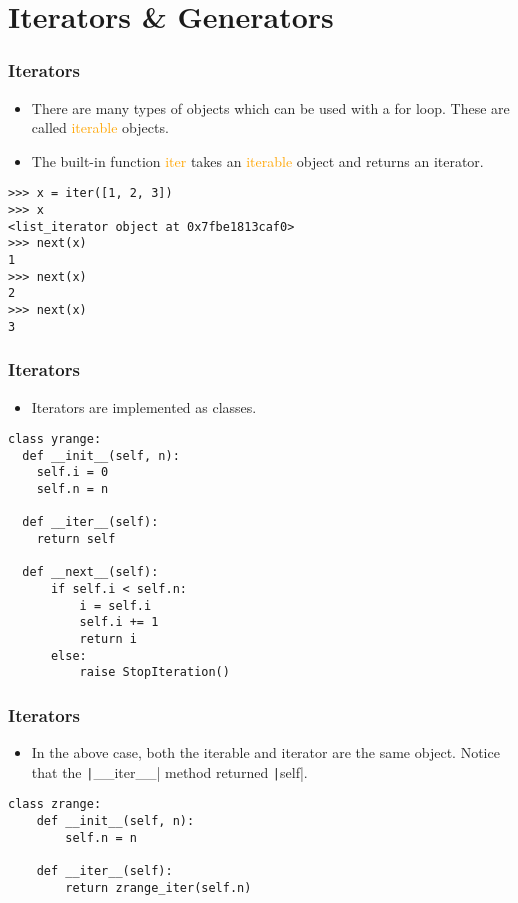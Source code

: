 \documentclass{../py-lecture}
\begin{document}
\section{Iterators \& Generators}

\begin{frame}[fragile]
	\frametitle{Iterators}
  \begin{itemize}
    \item There are many types of objects which can be used with a for loop.
    These are called \textcolor{Orange}{iterable} objects.
    \item The built-in function \textcolor{Orange}{iter} takes an \textcolor{Orange}{iterable}
    object and returns an iterator.
  \end{itemize}
  \begin{verbatim}
>>> x = iter([1, 2, 3])
>>> x
<list_iterator object at 0x7fbe1813caf0>
>>> next(x)
1
>>> next(x)
2
>>> next(x)
3
  \end{verbatim}
\end{frame}

\begin{frame}[fragile]
	\frametitle{Iterators}
  \begin{itemize}
    \item Iterators are implemented as classes.
  \end{itemize}
  \begin{verbatim}
class yrange:
  def __init__(self, n):
    self.i = 0
    self.n = n

  def __iter__(self):
    return self

  def __next__(self):
      if self.i < self.n:
          i = self.i
          self.i += 1
          return i
      else:
          raise StopIteration()
    \end{verbatim}
\end{frame}

\begin{frame}[fragile]
	\frametitle{Iterators}
  \begin{itemize}
    \item In the above case, both the iterable and iterator are the same object. Notice that the \texttt|__iter__| method returned \texttt|self|.
  \end{itemize}
  \begin{verbatim}
class zrange:
    def __init__(self, n):
        self.n = n

    def __iter__(self):
        return zrange_iter(self.n)
  \end{verbatim}
\end{frame}
\end{document}
